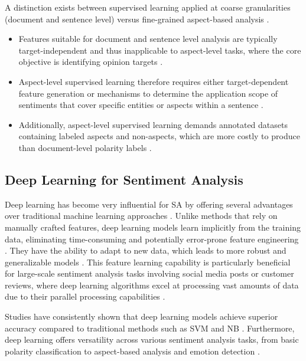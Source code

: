 \documentclass[a4paper,twoside,12pt]{book}
\begin{document}
A distinction exists between supervised learning applied at coarse granularities (document and sentence level) versus fine-grained aspect-based analysis \cite{azzeddine2018sentiment}. 

\begin{itemize}
	\item Features suitable for document and sentence level analysis are typically target-independent and thus inapplicable to aspect-level tasks, where the core objective is identifying opinion targets \cite{azzeddine2018sentiment}.
	 
	\item Aspect-level supervised learning therefore requires either target-dependent feature generation or mechanisms to determine the application scope of sentiments that cover specific entities or aspects within a sentence \cite{azzeddine2018sentiment}.
	
	\item Additionally, aspect-level supervised learning demands annotated datasets containing labeled aspects and non-aspects, which are more costly to produce than document-level polarity labels \cite{azzeddine2018sentiment}.
\end{itemize}

\subsection{Deep Learning for Sentiment Analysis}

Deep learning has become very influential for SA by offering several advantages over traditional machine learning approaches \cite{sharma2025review, ain2017sentiment}. Unlike methods that rely on manually crafted features, deep learning models learn implicitly from the training data, eliminating time-consuming and potentially error-prone feature engineering \cite{ain2017sentiment}. They have the ability to adapt to new data, which leads to more robust and generalizable models \cite{sharma2025review}. This feature learning capability is particularly beneficial for large-scale sentiment analysis tasks involving social media posts or customer reviews, where deep learning algorithms excel at processing vast amounts of data due to their parallel processing capabilities \cite{sharma2025review}.

Studies have consistently shown that deep learning models achieve superior accuracy compared to traditional methods such as SVM and NB \cite{behdenna2018document, mulianingrum2025comparative, sharma2025review, ain2017sentiment}. Furthermore, deep learning offers versatility across various sentiment analysis tasks, from basic polarity classification to aspect-based analysis and emotion detection \cite{sharma2025review}.
\end{document}
